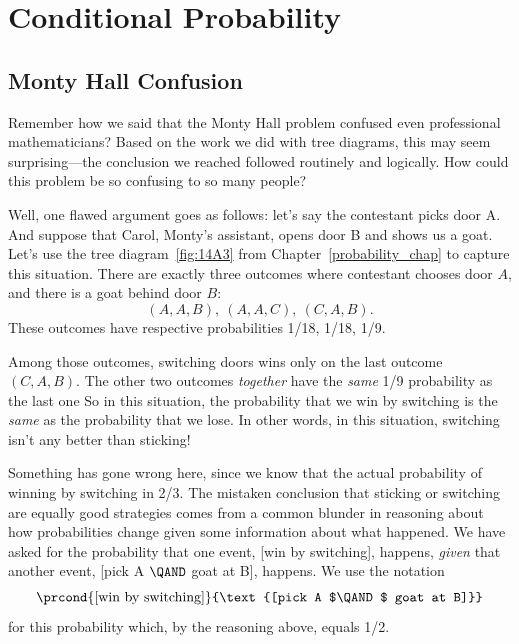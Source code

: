 \chapter{Conditional Probability}\label{chap:cond_prob} %

\begin{editingnotes}
\end{editingnotes}

\section{Monty Hall Confusion}\label{sec:confuse_Monty}
Remember how we said that the Monty Hall problem confused even
professional mathematicians?  Based on the work we did with tree
diagrams, this may seem surprising---the conclusion we reached
followed routinely and logically.  How could this problem be so
confusing to so many people?

Well, one flawed argument goes as follows: let's say the contestant
picks door A.  And suppose that Carol, Monty's assistant, opens door B
and shows us a goat.  Let's use the tree diagram~\ref{fig:14A3} from
Chapter~\ref{probability_chap} to capture this situation.  There are
exactly three outcomes where contestant chooses door $A$, and there is
a goat behind door $B$:
\begin{equation}\label{aabaaccab}
(A, A, B),\ (A, A, C),\ (C, A, B).
\end{equation}
These outcomes have respective probabilities 1/18, 1/18, 1/9.

Among those outcomes, switching doors wins only on the last outcome
$(C, A, B)$.  The other two outcomes \emph{together} have the
\emph{same} 1/9 probability as the last one So in this situation, the
probability that we win by switching is the \emph{same} as the
probability that we lose.  In other words, in this situation,
switching isn't any better than sticking!

Something has gone wrong here, since we know that the actual
probability of winning by switching in 2/3.  The mistaken conclusion
that sticking or switching are equally good strategies comes from a
common blunder in reasoning about how probabilities change given some
information about what happened.  We have asked for the probability
that one event, [win by switching], happens, \emph{given} that another
event, [pick A $\QAND$ goat at B], happens.  We use the notation
\[
\prcond{\text{[win by switching]}}{\text{[pick A $\QAND$ goat at B]}}
\]
for this probability which, by the reasoning above, equals 1/2.

